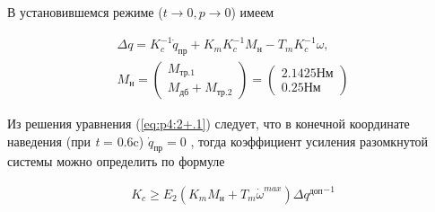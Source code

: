 В установившемся режиме ($t\rightarrow0, p\rightarrow0$) имеем\par
\begin{comment}
\begin{equation}
\label{eq:p4:415+2}
\begin{alignedat}{2}
\Delta  \alpha =
\frac{1}{K_{c1}} \dot \alpha_{\textit{пр}} + \frac{K_{m1}}{K_{c1}}M_{H1} - \frac{T_{M1}}{K_{c1}} \dot \psi ,
M_{Н1}=M_{\textit{ТР1}}+M_{\textit{дб1}}=2.1425\textit{Нм}
\end{alignedat}
\end{equation}
\end{comment}
\begin{equation}
\label{eq:p4:415+2}
\begin{alignedat}{2}
\Delta  q =
K_{c}^{-1} \dot q_{\textit{пр}} + K_{m} K_{c}^{-1} M_{\textit{н}} - T_{m} K_{c}^{-1} \omega ,\\
M_{\textit{н}} = \left( \begin{array}{c}
M_{\textit{тр.1}} \\
M_{\textit{дб}} + M_{\textit{тр.2}}
\end{array}\right)=
\left( \begin{array}{c}
2.1425\textit{Нм} \\
0.25 \textit{Нм}
\end{array}\right)
\end{alignedat}
\end{equation}

Из решения уравнения (\ref{eq:p4:2+.1}) следует, что в конечной координате наведения (при \textit{t} = 0.6c)  \( \dot q _{\textit{пр}}=0 \) , тогда коэффициент усиления разомкнутой системы можно определить по формуле \par
\begin{comment}
\begin{equation}
\label{eq:p4:416}
\begin{alignedat}{2}
K_{c1} \geq \frac{K_{m1}M_{H1}+T_{M1} \ddot \psi ^{max}}{ \Delta  \alpha ^{\textit{доп}}}
\end{alignedat}
\end{equation}
\end{comment}

\begin{equation}
\label{eq:p4:416}
\begin{alignedat}{2}
K_{c} \geq E_2 {(K_{m}M_{\textit{н}}+T_{m} \dot \omega ^{max})}{ \Delta  {q ^{\textit{доп}}}^{-1}}
\end{alignedat}
\end{equation}

